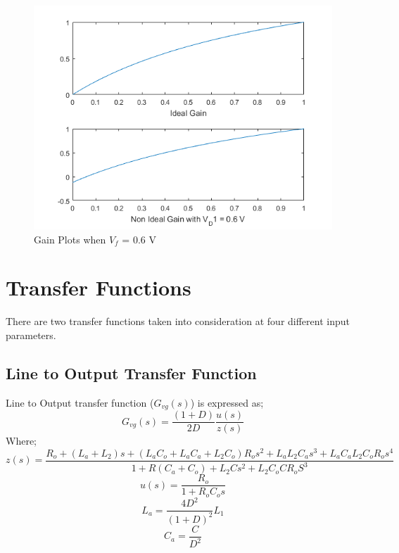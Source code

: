 \documentclass[12pt]{article}
\begin{document}
\begin{figure}[!h]
\caption{Gain Plots when $V_f$ = 0.6 V}
\centering
\includegraphics[scale=0.8]{images/gain_wvd.png}
\end{figure}

\section{Transfer Functions}
There are two transfer functions taken into consideration at four different input parameters.

\subsection{Line to Output Transfer Function}
Line to Output transfer function ($G_{vg}(s)$) is expressed as;
$$G_{vg}(s) = \frac{(1+D)}{2D}\frac{u(s)}{z(s)}$$
Where;
$$z(s) = \frac{R_o + (L_a + L_2)s + (L_a C_o + L_a C_a + L_2 C_o)R_o s^2 + L_a L_2 C_a s^3 + L_a C_a L_2 C_o R_o s^4}{1+R(C_a + C_o)+L_2 Cs^2 + L_2 C_o CR_o S^3}$$
$$u(s) = \frac{R_o}{1+R_o C_o s}$$
$$L_a = \frac{4D^2}{(1+D)^2}L_1$$
$$C_a = \frac{C}{D^2}$$
\end{document}
